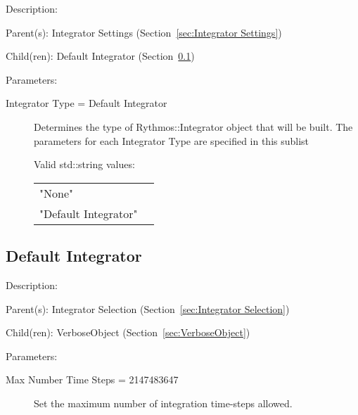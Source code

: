 \begin{list}{}
  {\setlength{\leftmargin}{1.0in}
   \setlength{\labelwidth}{0.75in}
   \setlength{\labelsep}{0.125in}}
  \item[Description:]
  \item[Parent(s):]
    Integrator Settings (Section~\ref{sec:Integrator Settings})
  \item[Child(ren):]
    Default Integrator (Section~\ref{sec:Default Integrator})
  \item[Parameters:]
    \begin{description}
      \item[Integrator Type = Default Integrator] 
Determines the type of Rythmos::Integrator object that will be built.
The parameters for each Integrator Type are specified in this sublist

  Valid std::string values:

      \begin{tabular}{lp{}}
      "None" & \\ 
      "Default Integrator" & \\ 
      \end{tabular}
\end{description}

\end{list}

\subsection{Default Integrator}
\label{sec:Default Integrator}

\begin{list}{}
  {\setlength{\leftmargin}{1.0in}
   \setlength{\labelwidth}{0.75in}
   \setlength{\labelsep}{0.125in}}
  \item[Description:]
  \item[Parent(s):]
    Integrator Selection (Section~\ref{sec:Integrator Selection})
  \item[Child(ren):]
    VerboseObject (Section~\ref{sec:VerboseObject})
  \item[Parameters:]
    \begin{description}
      \item[Max Number Time Steps = 2147483647] 
Set the maximum number of integration time-steps allowed.
\end{description}

\end{list}

